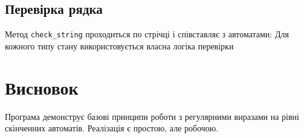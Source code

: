 \documentclass{article}
\begin{document}
\subsection{Перевірка рядка}
Метод \texttt{check\_string} проходиться по стрічці і співставляє з автоматами:
Для кожного типу стану використовується власна логіка перевірки




\section{Висновок}
Програма демонструє базові принципи роботи з регулярними виразами на рівні скінченних автоматів. Реалізація є простою, але робочою.
\end{document}
